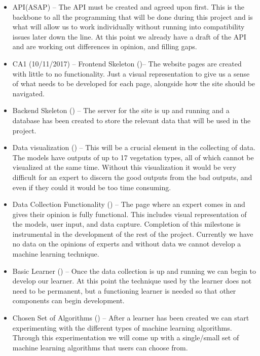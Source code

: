 \documentclass[11pt]{article} %
\numberwithin{equation}{section}
\begin{document}
\begin{itemize}

\item API(ASAP) – The API must be created and agreed upon first. This is the backbone to all the programming that will be done during this project and is what will allow us to work individually without running into compatibility issues later down the line. At this point we already have a draft of the API and are working out differences in opinion, and filling gaps.

\item CA1 (10/11/2017) – 
Frontend Skeleton ()– The website pages are created with little to no functionality. Just a visual representation to give us a sense of what needs to be developed for each page, alongside how the site should be navigated.

\item Backend Skeleton () –  The server for the site is up and running and a database has been created to store the relevant data that will be used in the project. 

\item Data visualization () –  This will be a crucial element in the collecting of data. The models have outputs of up to 17 vegetation types, all of which cannot be visualized at the same time. Without this visualization it would be very difficult for an expert to discern the good outputs from the bad outputs, and even if they could it would be too time consuming.

\item Data Collection Functionality () – The page where an expert comes in and gives their opinion is fully functional. This includes visual representation of the models, user input, and data capture. Completion of this milestone is instrumental in the development of the rest of the project. Currently we have no data on the opinions of experts and without data we cannot develop a machine learning technique.

\item Basic Learner () – Once the data collection is up and running we can begin to develop our learner. At this point the technique used by the learner does not need to be permanent, but a functioning learner is needed so that other components can begin development.

\item Chosen Set of Algorithms () – After a learner has been created we can start experimenting with the different types of machine learning algorithms. Through this experimentation we will come up with a single/small set of machine learning algorithms that users can choose from.


\end{itemize}
\end{document}
